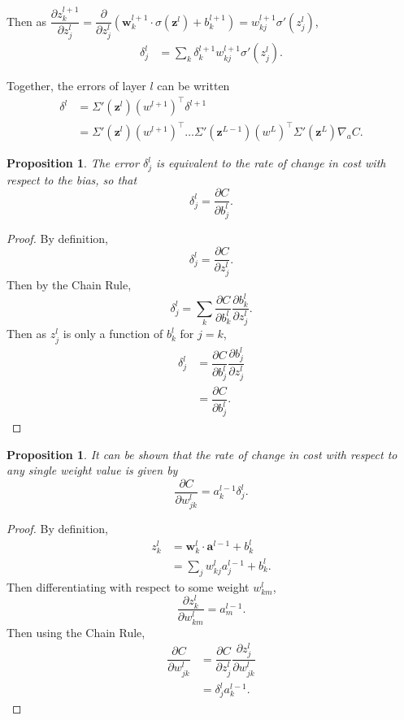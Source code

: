 \documentclass[honours,12pt]{unswthesis}
\newtheorem{proposition}[theorem]{Proposition}
\numberwithin{equation}{section}
\begin{document}
Then as $\dfrac{\partial z_k^{l+1}}{\partial z_j^l} = \dfrac{\partial}{\partial z_j^l}(\mathbf{w}_k^{l+1}\cdot\sigma(\mathbf{z}^{l}) + b_k^{l+1}) = w_{kj}^{l+1}\sigma'(z_j^l)$,
\begin{align*}
	\delta_j^l & = \sum_k\delta_k^{l+1}w_{kj}^{l+1}\sigma'(z_j^l).
\end{align*}

Together, the errors of layer $l$ can be written
\begin{align*}
	\delta^l & = \Sigma'(\mathbf{z}^l)(w^{l+1})^\top\delta^{l+1} \\
	& = \Sigma'(\mathbf{z}^l)(w^{l+1})^\top\ldots\Sigma'(\mathbf{z}^{L-1})(w^L)^\top\Sigma'(\mathbf{z}^L)\nabla_aC.
\end{align*}

\begin{proposition}
	The error $\delta_j^l$ is equivalent to the rate of change in cost with respect to the bias, so that
	\[
		\delta_j^l = \dfrac{\partial C}{\partial b_j^l}.
	\]
\end{proposition}
\begin{proof}
	By definition,
	\[
		\delta_j^l = \dfrac{\partial C}{\partial z_j^l}.
	\]
	Then by the Chain Rule,
	\[
		\delta_j^l = \sum_k\dfrac{\partial C}{\partial b_k^l}\dfrac{\partial b_k^l}{\partial z_j^l}.
	\]
	Then as $z_j^l$ is only a function of $b_k^l$ for $j = k$,
	\begin{align*}
		\delta_j^l & = \dfrac{\partial C}{\partial b_j^l}\dfrac{\partial b_j^l}{\partial z_j^l} \\
		& = \dfrac{\partial C}{\partial b_j^l}.
	\end{align*}
\end{proof}

\begin{proposition}
	It can be shown that the rate of change in cost with respect to any single weight value is given by
	\[
		\dfrac{\partial C}{\partial w_{jk}^l} = a_k^{l-1}\delta_j^l.
	\]
\end{proposition}
\begin{proof}
	By definition,
	\begin{align*}
		z_k^l & = \mathbf{w}_k^l\cdot\mathbf{a}^{l-1} + b_k^l \\
		& = \sum_jw_{kj}^la_j^{l-1} + b_k^l.
	\end{align*}
	Then differentiating with respect to some weight $w_{km}^l$,
	\[
		\dfrac{\partial z_k^l}{\partial w_{km}^l} = a_m^{l-1}.
	\]
	Then using the Chain Rule,
	\begin{align*}	
		\dfrac{\partial C}{\partial w_{jk}^l} & = \dfrac{\partial C}{\partial z_j^l}\dfrac{\partial z_j^l}{\partial w_{jk}^l} \\
		& = \delta_j^l a_k^{l-1}.
	\end{align*}
\end{proof}
\end{document}
